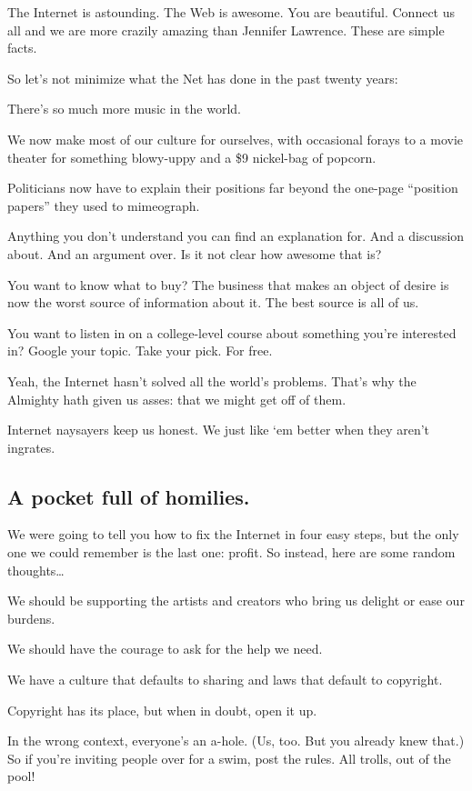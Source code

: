 \documentclass[letterpaper,12pt,english]{sphinxmanual}
\begin{document}
The Internet is astounding. The Web is awesome. You are beautiful. Connect us all and we are more crazily amazing than Jennifer Lawrence. These are simple facts.

So let's not minimize what the Net has done in the past twenty years:

There's so much more music in the world.

We now make most of our culture for ourselves, with occasional forays to a movie theater for something blowy-uppy and a \$9 nickel-bag of popcorn.

Politicians now have to explain their positions far beyond the one-page ``position papers'' they used to mimeograph.

Anything you don't understand you can find an explanation for. And a discussion about. And an argument over. Is it not clear how awesome that is?

You want to know what to buy? The business that makes an object of desire is now the worst source of information about it. The best source is all of us.

You want to listen in on a college-level course about something you're interested in? Google your topic. Take your pick. For free.

Yeah, the Internet hasn't solved all the world's problems. That's why the Almighty hath given us asses: that we might get off of them.

Internet naysayers keep us honest. We just like `em better when they aren't ingrates.


\subsection{A pocket full of homilies.}
\label{2015newclues:a-pocket-full-of-homilies}
We were going to tell you how to fix the Internet in four easy steps, but the only one we could remember is the last one: profit. So instead, here are some random thoughts…

We should be supporting the artists and creators who bring us delight or ease our burdens.

We should have the courage to ask for the help we need.

We have a culture that defaults to sharing and laws that default to copyright.

Copyright has its place, but when in doubt, open it up.

In the wrong context, everyone's an a-hole. (Us, too. But you already knew that.) So if you're inviting people over for a swim, post the rules. All trolls, out of the pool!
\end{document}
